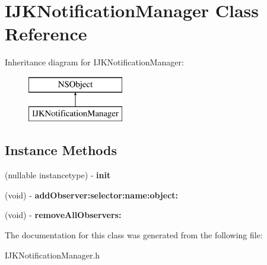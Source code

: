\hypertarget{interface_i_j_k_notification_manager}{}\section{I\+J\+K\+Notification\+Manager Class Reference}
\label{interface_i_j_k_notification_manager}
Inheritance diagram for I\+J\+K\+Notification\+Manager\+:\begin{figure}[H]
\begin{center}
\leavevmode
\includegraphics[height=2.000000cm]{interface_i_j_k_notification_manager}
\end{center}
\end{figure}
\subsection*{Instance Methods}
\begin{DoxyCompactItemize}
\item 
\mbox{\label{interface_i_j_k_notification_manager_a1caa6c8b26b60d30fae4fd75047038ab}} 
(nullable instancetype) -\/ {\bfseries init}
\item 
\mbox{\label{interface_i_j_k_notification_manager_a72c45d5667f3200d7a8bdced9cda19aa}} 
(void) -\/ {\bfseries add\+Observer\+:selector\+:name\+:object\+:}
\item 
\mbox{\label{interface_i_j_k_notification_manager_a892a0796787e0fd89030aa97c75f6b96}} 
(void) -\/ {\bfseries remove\+All\+Observers\+:}
\end{DoxyCompactItemize}


The documentation for this class was generated from the following file\+:\begin{DoxyCompactItemize}
\item 
I\+J\+K\+Notification\+Manager.\+h\end{DoxyCompactItemize}
